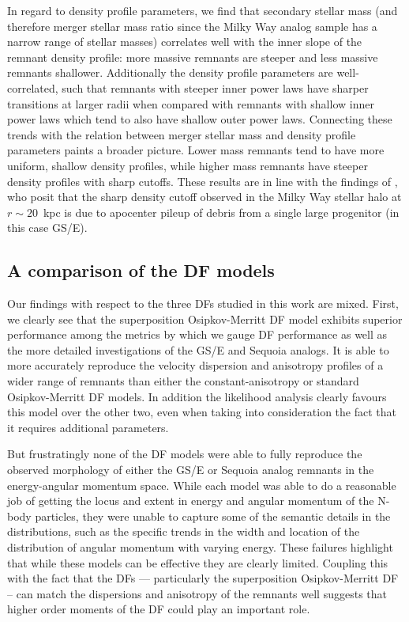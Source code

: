 In regard to density profile parameters, we find that secondary stellar mass (and therefore merger stellar mass ratio since the Milky Way analog sample has a narrow range of stellar masses) correlates well with the inner slope of the remnant density profile: more massive remnants are steeper and less massive remnants shallower. Additionally the density profile parameters are well-correlated, such that remnants with steeper inner power laws have sharper transitions at larger radii when compared with remnants with shallow inner power laws which tend to also have shallow outer power laws. Connecting these trends with the relation between merger stellar mass and density profile parameters paints a broader picture. Lower mass remnants tend to have more uniform, shallow density profiles, while higher mass remnants have steeper density profiles with sharp cutoffs. These results are in line with the findings of \textcite{deason18}, who posit that the sharp density cutoff observed in the Milky Way stellar halo at $r \sim 20$~kpc is due to apocenter pileup of debris from a single large progenitor (in this case GS/E).

\subsection{A comparison of the DF models}

Our findings with respect to the three DFs studied in this work are mixed. First, we clearly see that the superposition Osipkov-Merritt DF model exhibits superior performance among the metrics by which we gauge DF performance as well as the more detailed investigations of the GS/E and Sequoia analogs. It is able to more accurately reproduce the velocity dispersion and anisotropy profiles of a wider range of remnants than either the constant-anisotropy or standard Osipkov-Merritt DF models. In addition the likelihood analysis clearly favours this model over the other two, even when taking into consideration the fact that it requires additional parameters.

But frustratingly none of the DF models were able to fully reproduce the observed morphology of either the GS/E or Sequoia analog remnants in the energy-angular momentum space. While each model was able to do a reasonable job of getting the locus and extent in energy and angular momentum of the N-body particles, they were unable to capture some of the semantic details in the distributions, such as the specific trends in the width and location of the distribution of angular momentum with varying energy. These failures highlight that while these models can be effective they are clearly limited. Coupling this with the fact that the DFs --- particularly the superposition Osipkov-Merritt DF -- can match the dispersions and anisotropy of the remnants well suggests that higher order moments of the DF could play an important role.

